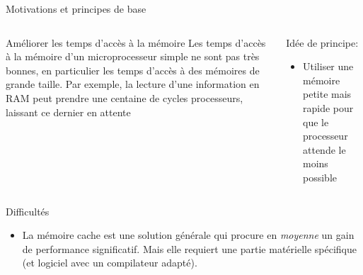 
% 
\begin{Frame}{Motivations et principes de base}
  \begin{columns}[t]
    \begin{column}{\BW} %
      \begin{block}{ Améliorer les temps d'accès à la mémoire}
        Les temps d'accès à la mémoire d'un microprocesseur
        simple ne sont pas très bonnes, en particulier les temps
        d'accès à des mémoires de grande taille. Par exemple, la
        lecture d'une information en RAM peut prendre une centaine de
        cycles processeurs, laissant ce dernier en attente
      \end{block} 
    \end{column}
    
    \begin{column}{\BW} %
      \begin{block}{Idée de principe:}
        \begin{itemize}
        \item Utiliser une mémoire petite mais rapide pour que le processeur
          attende le moins possible
        \end{itemize}
      \end{block}   
    \end{column}
  \end{columns}  

  \begin{block}{Difficultés}
    \begin{center}
      \begin{itemize}
      \item La mémoire cache est une solution générale qui procure en
        \emph{moyenne} un gain de performance significatif. Mais elle
        requiert une partie matérielle spécifique (et logiciel avec un
        compilateur adapté).
        \end{itemize}
       \end{center}
      \end{block}   

\end{Frame}


